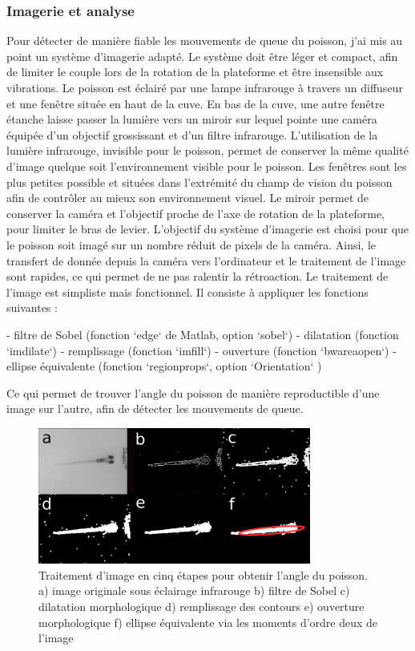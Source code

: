 \subsubsection{Imagerie et analyse}
Pour détecter de manière fiable les mouvements de queue du poisson, j'ai mis au point un système d'imagerie adapté. Le système doit être léger et compact, afin de limiter le couple lors de la rotation de la plateforme et être insensible aux vibrations. Le poisson est éclairé par une lampe infrarouge à travers un diffuseur et une fenêtre située en haut de la cuve. En bas de la cuve, une autre fenêtre étanche laisse passer la lumière vers un miroir sur lequel pointe une caméra équipée d'un objectif grossissant et d'un filtre infrarouge. L'utilisation de la lumière infrarouge, invisible pour le poisson, permet de conserver la même qualité d'image quelque soit l'environnement visible pour le poisson. Les fenêtres sont les plus petites possible et situées dans l'extrémité du champ de vision du poisson afin de contrôler au mieux son environnement visuel. Le miroir permet de conserver la caméra et l'objectif proche de l'axe de rotation de la plateforme, pour limiter le bras de levier.
L'objectif du système d'imagerie est choisi pour que le poisson soit imagé sur un nombre réduit de pixels de la caméra. Ainsi, le transfert de donnée depuis la caméra vers l'ordinateur et le traitement de l'image sont rapides, ce qui permet de ne pas ralentir la rétroaction. Le traitement de l'image est simpliste mais fonctionnel. Il consiste à appliquer les fonctions suivantes :

- filtre de Sobel (fonction `edge` de Matlab, option `sobel`)
- dilatation (fonction `imdilate`)
- remplissage (fonction `imfill`)
- ouverture (fonction `bwareaopen`)
- ellipse équivalente (fonction `regionprops`, option `Orientation` )

Ce qui permet de trouver l'angle du poisson de manière reproductible d'une image sur l'autre, afin de détecter les mouvements de queue.

\begin{figure}
\centering
\includegraphics[width=0.8\textwidth]{./files/image_process.png}
\caption{Traitement d'image en cinq étapes pour obtenir l'angle du poisson. a) image originale sous éclairage infrarouge b) filtre de Sobel c) dilatation morphologique d) remplissage des contours e) ouverture morphologique f) ellipse équivalente via les moments d'ordre deux de l'image}
\end{figure}

